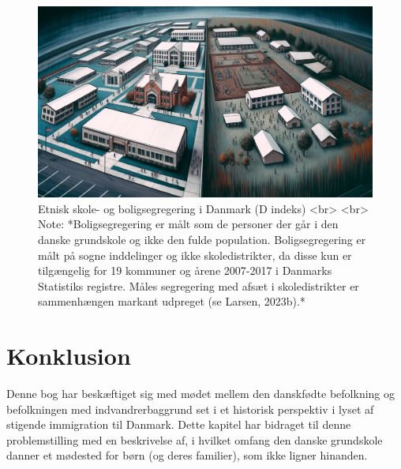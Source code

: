 \documentclass[
]{book}
\begin{document}
\begin{figure}
\includegraphics[width=24.89in]{images/dalle-schoolseg} \caption{Etnisk skole- og boligsegregering i Danmark (D indeks) <br> <br> Note: *Boligsegregering er målt som de personer der går i den danske grundskole og ikke den fulde population. Boligsegregering er målt på sogne inddelinger og ikke skoledistrikter, da disse kun er tilgængelig for 19 kommuner og årene 2007-2017 i Danmarks Statistiks registre. Måles segregering med afsæt i skoledistrikter er sammenhængen markant udpreget (se Larsen, 2023b).*}\label{fig:fig-3-4}
\end{figure}

\hypertarget{konklusion}{%
\section{Konklusion}\label{konklusion}}

Denne bog har beskæftiget sig med mødet mellem den danskfødte befolkning og befolkningen med indvandrerbaggrund set i et historisk perspektiv i lyset af stigende immigration til Danmark. Dette kapitel har bidraget til denne problemstilling med en beskrivelse af, i hvilket omfang den danske grundskole danner et mødested for børn (og deres familier), som ikke ligner hinanden.
\end{document}
